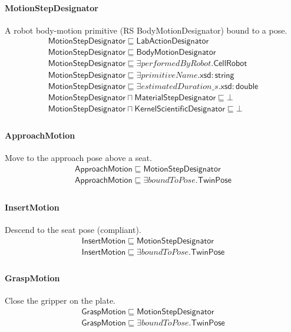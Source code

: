 \documentclass[10pt]{article}
\begin{document}
\paragraph{MotionStepDesignator} A robot body-motion primitive (RS BodyMotionDesignator) bound to a pose.
\[\begin{array}{l}
\mathsf{MotionStepDesignator} \sqsubseteq  \mathsf{LabActionDesignator} \\
\mathsf{MotionStepDesignator} \sqsubseteq  \mathsf{BodyMotionDesignator} \\
\mathsf{MotionStepDesignator} \sqsubseteq  \exists \mathit{performedByRobot}.\mathsf{CellRobot} \\
\mathsf{MotionStepDesignator} \sqsubseteq  \exists \mathit{primitiveName}.\mathsf{xsd{:}string} \\
\mathsf{MotionStepDesignator} \sqsubseteq  \exists \mathit{estimatedDuration\_s}.\mathsf{xsd{:}double} \\
\mathsf{MotionStepDesignator} \sqcap  \mathsf{MaterialStepDesignator} \sqsubseteq  \bot  \\
\mathsf{MotionStepDesignator} \sqcap  \mathsf{KernelScientificDesignator} \sqsubseteq  \bot  \\
\end{array}\]
\paragraph{ApproachMotion} Move to the approach pose above a seat.
\[\begin{array}{l}
\mathsf{ApproachMotion} \sqsubseteq  \mathsf{MotionStepDesignator} \\
\mathsf{ApproachMotion} \sqsubseteq  \exists \mathit{boundToPose}.\mathsf{TwinPose} \\
\end{array}\]
\paragraph{InsertMotion} Descend to the seat pose (compliant).
\[\begin{array}{l}
\mathsf{InsertMotion} \sqsubseteq  \mathsf{MotionStepDesignator} \\
\mathsf{InsertMotion} \sqsubseteq  \exists \mathit{boundToPose}.\mathsf{TwinPose} \\
\end{array}\]
\paragraph{GraspMotion} Close the gripper on the plate.
\[\begin{array}{l}
\mathsf{GraspMotion} \sqsubseteq  \mathsf{MotionStepDesignator} \\
\mathsf{GraspMotion} \sqsubseteq  \exists \mathit{boundToPose}.\mathsf{TwinPose} \\
\end{array}\]
\end{document}
